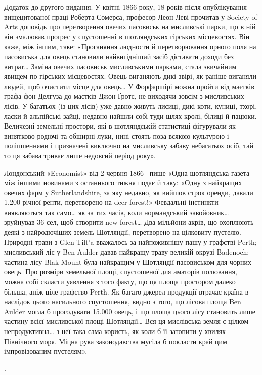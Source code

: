 {Додаток до другого видання. У квітні 1866 року, 18 років після
опублікування вищецитованої праці Роберта Сомерса, професор Леон
Леві прочитав у Society of Arts доповідь про перетворення овечих пасовиськ
на мисливські парки, що в ній він змалював проґрес у спустошенні
в шотляндських гірських місцевостях. Він каже, між іншим, таке: «Проганяння
людности й перетворювання орного поля на пасовиська для
овець становили найвигідніший засіб діставати доходи без витрат\dots{} Заміна
овечих пасовиськ мисливськими парками, стала звичайним явищем
по гірських місцевостях. Овець виганяють дикі звірі, як раніше виганяли
людей, щоб очистити місце для овець\dots{} У Форфаршірі можна пройти
від маєтків графа фон Делгуза до маєтків Джон Ґротс, не виходячи
зовсім з мисливських лісів. У багатьох (із цих лісів) уже давно живуть
лисиці, дикі коти, куниці, тхорі, ласки й альпійські зайці, недавно
найшли собі туди шлях кролі, білиці й пацюки. Величезні земельні простори,
які в шотляндській статистиці фігурували як винятково родючі
та обширні луки, нині стоять поза всякою культурою і поліпшеннями і
призначені виключно на мисливську забаву небагатьох осіб, тай то ця
забава триває лише недовгий період року».

Лондонський «Economist» від 2 червня 1866~ пише «Одна шотляндська
газета між іншими новинами з останнього тижня подає й таку:
«Одну з найкращих овечих фарм у Sutherlandshire, за яку недавно, як
вийшов строк оренди, давали \num{1.200} річної ренти, перетворено
на deer forest!» Февдальні інстинкти виявляються так само\dots{}
як за тих часів, коли нормандський завойовник\dots{} зруйнував 36 сел, щоб
створити new forest\dots{} Два мільйони акрів, що охоплюють деякі з найродючіших
земель Шотляндії, перетворено на цілковиту пустелю. Природні
трави з Glen Tilt’a вважалось за найпоживнішу пашу у графстві Perth;
мисливський ліс у Ben Aulder давав найкращу траву великій окрузі
Badenoch; частина лісу Blak-Mount була найкращим у Шотляндії пасовиськом
для чорних овець. Про розміри земельної площі, спустошеної
для аматорів полювання, можна собі скласти уявлення з того факту, що
ця площа простором далеко більша, аніж ціле графство Perth. Як багато
джерел продукції втрачає країна в наслідок цього насильного спустошення,
видно з того, що лісова площа Ben Aulder могла б прогодувати
\num{15.000} овець, і що площа цього лісу становить лише  частину всієї
мисливської площі Шотляндії\dots{} Вся ця мислівська земля є цілком непродуктивна\dots{}
з неї така сама користь, як коли б її затопити у хвилях
Північного моря. Міцна рука законодавства мусіла б покласти край цим
імпровізованим пустелям».
}.

